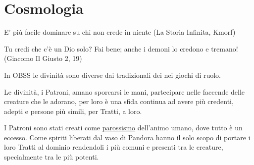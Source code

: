 \section{Cosmologia}\hypertarget{cosmologia}{}\label{cosmologia}

\begin{changemargin}{0.3cm}{0.3cm}\begin{enfasi}{
E' più facile dominare su chi non crede in niente (La Storia Infinita, Kmorf)

\medskip

Tu credi che c'è un Dio solo? Fai bene; anche i demoni lo credono e tremano! (Giacomo Il Giusto 2, 19)}\end{enfasi}\end{changemargin}\medskip

\begin{changemargin}{0.3cm}{0.3cm}\begin{narratore}

In OBSS le divinità sono diverse dai tradizionali dei nei giochi di ruolo.

Le divinità, i Patroni, amano sporcarsi le mani, partecipare nelle faccende delle creature che le adorano, per loro è una sfida continua ad avere più credenti, adepti e persone più simili, per Tratti, a loro.

I Patroni sono stati creati come \href{https://www.treccani.it/vocabolario/parossismo/}{parossismo} dell'animo umano, dove tutto è un eccesso. Come spiriti liberati dal vaso di Pandora hanno il solo scopo di portare i loro Tratti al dominio rendendoli i più comuni e presenti tra le creature, specialmente tra le più potenti.
\end{narratore}\end{changemargin}

\medskip


